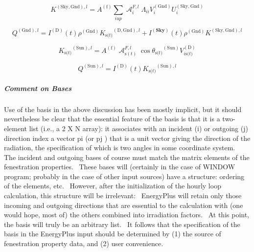 \begin{equation}
{K^{{\mathrm{(Sky, Gnd)}},l}} = {A^{{\mathrm{(f)}}}}\sum\limits_{i{\mathrm{ }}up} {\operatorname{\mathcal{A}}_i^{F,l}{\Lambda_{ii}}V_i^{{\mathrm{(Gnd)}}}U_i^{{\mathrm{(Sky, Gnd)}}}}
\end{equation}

\begin{equation}
{Q^{{\mathrm{(Gnd)}},l}} = {I^{{\mathrm{(D)}}}}(t){\rho ^{{\mathrm{(Gnd)}}}}{K_{{\mathrm{s(}}t{\mathrm{)}}}}^{{\mathrm{(D, Gnd)}},l} + {I^{({\mathbf{Sky}})}}(t){\rho ^{{\mathrm{(Gnd)}}}}{K^{{\mathrm{(Sky, Gnd)}},l}}
\end{equation}

\begin{equation}
{K_{{\mathrm{s(}}t{\mathrm{)}}}}^{{\mathrm{(Sun)}},l} = {A^{{\mathrm{(f)}}}}\operatorname{\mathcal{A}}_{{\mathrm{s}}(t)}^{F,l}\cos {\theta_{{\mathrm{s(}}t{\mathrm{)}}}}^{{\mathrm{(Sun)}}}V_{i{\mathrm{ s(}}t{\mathrm{)}}}^{{\mathrm{(D)}}}
\end{equation}

\begin{equation}
{Q^{{\mathrm{(Sun)}},l}} = {I^{{\mathrm{(D)}}}}(t){K_{{\mathrm{s(}}t{\mathrm{)}}}}^{{\mathrm{(Sun)}},l}
\end{equation}

\subparagraph{Comment on Bases}\label{comment-on-bases}

Use of the basis in the above discussion has been mostly implicit, but it should nevertheless be clear that the essential feature of the basis is that it is a two-element list (i.e., a 2 X N array): it associates with an incident (i) or outgoing (j) direction index a vector pi (or pj ) that is a unit vector giving the direction of the radiation, the specification of which is two angles in some coordinate system.~ The incident and outgoing bases of course must match the matrix elements of the fenestration properties.~ These bases will (certainly in the case of WINDOW program; probably in the case of other input sources) have a structure: ordering of the elements, etc.~ However, after the initialization of the hourly loop calculation, this structure will be irrelevant:~ EnergyPlus will retain only those incoming and outgoing directions that are essential to the calculation with (one would hope, most of) the others combined into irradiation factors.~ At this point, the basis will truly be an arbitrary list.~ It follows that the specification of the basis in the EnergyPlus input should be determined by (1) the source of fenestration property data, and (2) user convenience.

